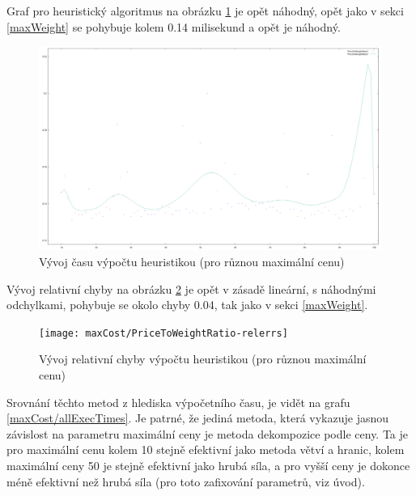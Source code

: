 \documentclass[12pt,a4paper]{article}
\begin{document}
Graf pro heuristický algoritmus na obrázku \ref{maxCost/PriceToWeightRatio} je opět náhodný, opět jako v sekci \ref{maxWeight} se pohybuje kolem 0.14 milisekund a opět je náhodný.

\begin{figure}[H]
\begin{center}
\includegraphics[width=\textwidth]{maxCost/PriceToWeightRatio}
\caption{Vývoj času výpočtu heuristikou (pro různou maximální cenu)}
\label{maxCost/PriceToWeightRatio}
\end{center}
\end{figure}

Vývoj relativní chyby na obrázku \ref{maxCost/PriceToWeightRatio-relerrs} je opět v zásadě lineární, s náhodnými odchylkami, pohybuje se okolo chyby 0.04, tak jako v sekci \ref{maxWeight}.

\begin{figure}[H]
\begin{center}
\texttt{[image: maxCost/PriceToWeightRatio-relerrs]}
\caption{Vývoj relativní chyby výpočtu heuristikou (pro různou maximální cenu)}
\label{maxCost/PriceToWeightRatio-relerrs}
\end{center}
\end{figure}

Srovnání těchto metod z hlediska výpočetního času, je vidět na grafu \ref{maxCost/allExecTimes}. Je patrné, že jediná metoda, která vykazuje jasnou závislost na parametru maximální ceny je metoda dekompozice podle ceny. Ta je pro maximální cenu kolem 10 stejně efektivní jako metoda větví a hranic, kolem maximální ceny 50 je stejně efektivní jako hrubá síla, a pro vyšší ceny je dokonce méně efektivní než hrubá síla (pro toto zafixování parametrů, viz úvod).
\end{document}
